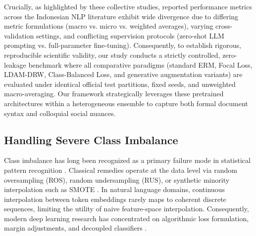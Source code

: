 \documentclass{ieeeaccess}
\begin{document}
Crucially, as highlighted by these collective studies, reported performance metrics across the Indonesian NLP literature exhibit wide divergence due to differing metric formulations (macro vs. micro vs. weighted averages), varying cross-validation settings, and conflicting supervision protocols (zero-shot LLM prompting vs. full-parameter fine-tuning). Consequently, to establish rigorous, reproducible scientific validity, our study conducts a strictly controlled, zero-leakage benchmark where all comparative paradigms (standard ERM, Focal Loss, LDAM-DRW, Class-Balanced Loss, and generative augmentation variants) are evaluated under identical official test partitions, fixed seeds, and unweighted macro-averaging. Our framework strategically leverages these pretrained architectures within a heterogeneous ensemble to capture both formal document syntax and colloquial social nuances.

\subsection{Handling Severe Class Imbalance}
\label{subsec:imbalance_lit}

Class imbalance has long been recognized as a primary failure mode in statistical pattern recognition \cite{raudys1991small, chawla2002smote, he2009learning, zhang2023deep, alshammari2022long, zhang2022balanced}. Classical remedies operate at the data level via random oversampling (ROS), random undersampling (RUS), or synthetic minority interpolation such as SMOTE \cite{chawla2002smote}. In natural language domains, continuous interpolation between token embeddings rarely maps to coherent discrete sequences, limiting the utility of naive feature-space interpolation. Consequently, modern deep learning research has concentrated on algorithmic loss formulation, margin adjustments, and decoupled classifiers \cite{menon2021longtail, kini2021vector, kang2021exploring}.
\end{document}
